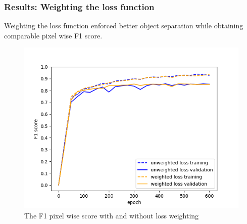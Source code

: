 \documentclass[aspectratio=1610]{beamer}
\begin{document}
\begin{frame}
  \frametitle{\hfill Results: Weighting the loss function}
  Weighting the loss function enforced better object separation while obtaining comparable pixel wise F1 score.
\begin{center}
\begin{figure}[H]
      \includegraphics[scale=0.4]{class_vs_w}
  \caption{The F1 pixel wise score with and without loss weighting} \label{fig:gan_vs_class}
\end{figure}
\end{center}
\end{frame}
\end{document}
